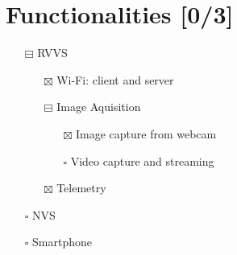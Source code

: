 \documentclass[11pt]{article}
\begin{document}
\section{Functionalities [0/3]}
\label{sec:org6ca3cb2}
\begin{itemize}
\item[{$\boxminus$}] RVVS
\begin{itemize}
\item[{$\boxtimes$}] Wi-Fi: client and server
\item[{$\boxminus$}] Image Aquisition
\begin{itemize}
\item[{$\boxtimes$}] Image capture from webcam
\item[{$\square$}] Video capture and streaming
\end{itemize}
\item[{$\boxtimes$}] Telemetry
\end{itemize}
\item[{$\square$}] NVS
\item[{$\square$}] Smartphone
\end{itemize}
\end{document}
